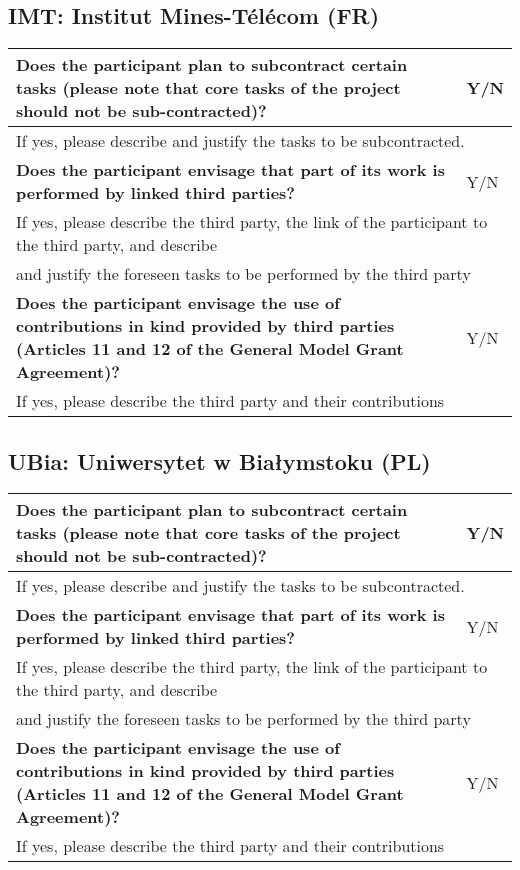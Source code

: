 \subsection{IMT: Institut Mines-Télécom (FR)}

\begin{longtable}{|p{}|p{}|}
\hline
{\bf Does the participant plan to subcontract certain tasks (please
  note that core tasks of the project should not be sub-contracted)?}
&
Y/N
\\
\hline
\multicolumn{2}{|l|}{
If yes, please describe and justify the tasks to be subcontracted.}
\\
\hline
{\bf Does the participant envisage that  part of its work is performed
  by linked third parties?}
&
Y/N
\\
\hline
\multicolumn{2}{|l|}{If yes, please describe the third party, the link of the
  participant to the third party, and describe}\\
\multicolumn{2}{|l|}{and justify the foreseen
tasks to be performed by the third party}
\\
\hline
{\bf Does the participant envisage the use of contributions in kind
provided by third parties (Articles 11 and 12 of the General Model
Grant Agreement)?}
&
Y/N
\\
\hline
\multicolumn{2}{|l|}{If yes, please describe the third party and their contributions}
\\
\hline
\end{longtable}

\subsection{UBia: Uniwersytet w Białymstoku (PL)}

\begin{longtable}{|p{}|p{}|}
\hline
{\bf Does the participant plan to subcontract certain tasks (please
  note that core tasks of the project should not be sub-contracted)?}
&
Y/N
\\
\hline
\multicolumn{2}{|l|}{
If yes, please describe and justify the tasks to be subcontracted.}
\\
\hline
{\bf Does the participant envisage that  part of its work is performed
  by linked third parties?}
&
Y/N
\\
\hline
\multicolumn{2}{|l|}{If yes, please describe the third party, the link of the
  participant to the third party, and describe}\\
\multicolumn{2}{|l|}{and justify the foreseen
tasks to be performed by the third party}
\\
\hline
{\bf Does the participant envisage the use of contributions in kind
provided by third parties (Articles 11 and 12 of the General Model
Grant Agreement)?}
&
Y/N
\\
\hline
\multicolumn{2}{|l|}{If yes, please describe the third party and their contributions}
\\
\hline
\end{longtable}


